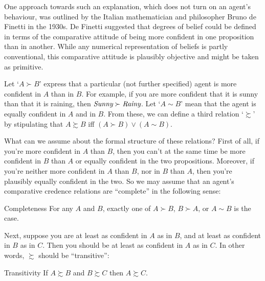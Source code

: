 One approach towards such an explanation, which does not turn on an
agent's behaviour, was outlined by the Italian mathematician and
philosopher Bruno de Finetti in the 1930s. De Finetti suggested that
degrees of belief could be defined in terms of the comparative
attitude of being more confident in one proposition than in another.
While any numerical representation of beliefs is partly conventional,
this comparative attitude is plausibly objective and might be taken as
primitive.

Let `$A \succ B$' express that a particular (not further
specified) agent is more confident in $A$ than in $B$. For example, if
you are more confident that it is sunny than that it is raining, then
$\emph{Sunny} \succ \emph{Rainy}$. Let `$A \sim B$' mean that the
agent is equally confident in $A$ and in $B$. From these, we can
define a third relation `$\succsim$' by stipulating that
$A \succsim B$ iff $(A \succ B) \lor (A \sim B)$.

What can we assume about the formal structure of these relations?
First of all, if you're more confident in $A$ than $B$, then you can't
at the same time be more confident in $B$ than $A$ or equally
confident in the two propositions. Moreover, if you're neither more
confident in $A$ than $B$, nor in $B$ than $A$, then you're plausibly
equally confident in the two. So we may assume that an agent's
comparative credence relations are ``complete'' in the following
sense:

\begin{genericthm}{Completeness}
  For any $A$ and $B$, exactly one of $A \succ B$, $B\succ A$, or $A
  \sim B$ is the case.
\end{genericthm}

Next, suppose you are at least as confident in $A$ as in $B$, and at
least as confident in $B$ as in $C$. Then you should be at
least as confident in $A$ as in $C$. In other words, $\succsim$ should
be ``transitive'':
\begin{genericthm}{Transitivity}
  If $A \succsim B$ and $B \succsim C$ then $A \succsim C$.
\end{genericthm}


